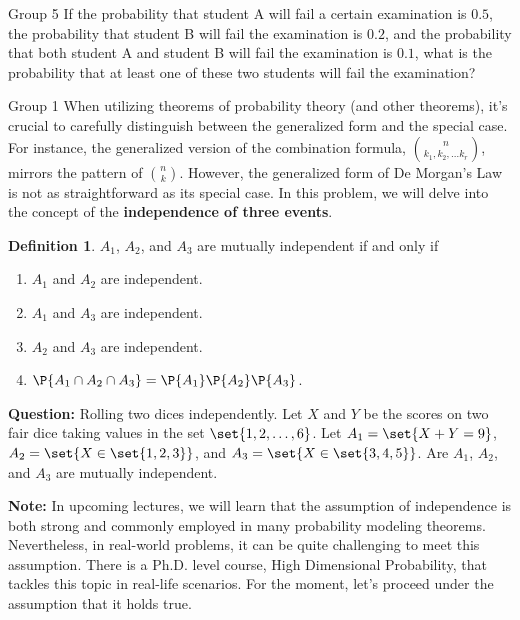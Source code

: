 \documentclass{article}
\theoremstyle{plain}
\theoremstyle{definition}
\newtheorem{definition}{Definition}[section]
\theoremstyle{remark}
\begin{document}
\begin{problem}
    {Group 5}
    If the probability that student A will fail a certain examination is $0.5$, the probability that student B will fail the examination is $0.2$, and the probability that both student A and student B will fail the examination is $0.1$, what is the probability that at least one of these two students will fail the examination?
\end{problem}
\begin{problem}
    {Group 1}
    When utilizing theorems of probability theory (and other theorems), it's crucial to carefully distinguish between the generalized form and the special case. For instance, the generalized version of the combination formula, $\binom{n}{k_1,k_2,\ldots k_r}$, mirrors the pattern of $\binom{n}{k}$. However, the generalized form of De Morgan's Law is not as straightforward as its special case. In this problem, we will delve into the concept of the \textbf{independence of three events}.
    \begin{definition}
        $A_1$, $A_2$, and $A_3$ are mutually independent if and only if
        \begin{enumerate}
            \item $A_1$ and $A_2$ are independent.
            \item $A_1$ and $A_3$ are independent.
            \item $A_2$ and $A_3$ are independent.
            \item $\P{A_1\cap A_2\cap A_3}=\P{A_1}\P{A_2}\P{A_3}$.
        \end{enumerate}
    \end{definition}
    \textbf{Question:} Rolling two dices independently. Let $X$ and $Y$ be the scores on two fair dice taking values in the set $\set{1,2,\ldots,6}$. Let $A_1 = \set{X+Y=9}$, $A_2=\set{X\in \set{1,2,3}}$, and $A_3=\set{X\in\set{3,4,5}}$. Are $A_1$, $A_2$, and $A_3$ are mutually independent.

    \textbf{Note:} In upcoming lectures, we will learn that the assumption of independence is both strong and commonly employed in many probability modeling theorems. Nevertheless, in real-world problems, it can be quite challenging to meet this assumption. There is a Ph.D. level course, High Dimensional Probability, that tackles this topic in real-life scenarios. For the moment, let's proceed under the assumption that it holds true.
\end{problem}
\end{document}
